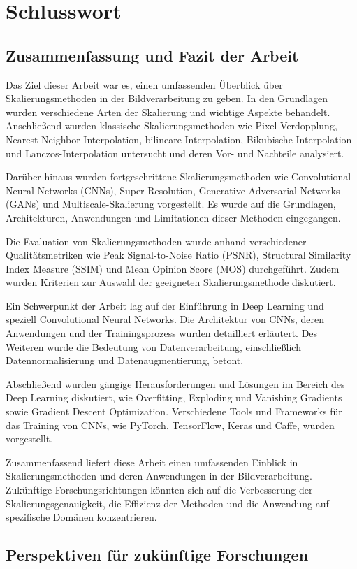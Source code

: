 \chapter{Schlusswort}

\section{Zusammenfassung und Fazit der Arbeit}

Das Ziel dieser Arbeit war es, einen umfassenden Überblick über Skalierungsmethoden in der Bildverarbeitung zu geben.
In den Grundlagen wurden verschiedene Arten der Skalierung und wichtige Aspekte behandelt. Anschließend wurden klassische Skalierungsmethoden wie Pixel-Verdopplung, Nearest-Neighbor-Interpolation, bilineare Interpolation, Bikubische Interpolation und Lanczos-Interpolation untersucht und deren Vor- und Nachteile analysiert.

Darüber hinaus wurden fortgeschrittene Skalierungsmethoden wie Convolutional Neural Networks (CNNs), Super Resolution, Generative Adversarial Networks (GANs) und Multiscale-Skalierung vorgestellt.
Es wurde auf die Grundlagen, Architekturen, Anwendungen und Limitationen dieser Methoden eingegangen.

Die Evaluation von Skalierungsmethoden wurde anhand verschiedener Qualitätsmetriken wie Peak Signal-to-Noise Ratio (PSNR), Structural Similarity Index Measure (SSIM) und Mean Opinion Score (MOS) durchgeführt.
Zudem wurden Kriterien zur Auswahl der geeigneten Skalierungsmethode diskutiert.

Ein Schwerpunkt der Arbeit lag auf der Einführung in Deep Learning und speziell Convolutional Neural Networks.
Die Architektur von CNNs, deren Anwendungen und der Trainingsprozess wurden detailliert erläutert.
Des Weiteren wurde die Bedeutung von Datenverarbeitung, einschließlich Datennormalisierung und Datenaugmentierung, betont.

Abschließend wurden gängige Herausforderungen und Lösungen im Bereich des Deep Learning diskutiert, wie Overfitting, Exploding und Vanishing Gradients sowie Gradient Descent Optimization.
Verschiedene Tools und Frameworks für das Training von CNNs, wie PyTorch, TensorFlow, Keras und Caffe, wurden vorgestellt.

Zusammenfassend liefert diese Arbeit einen umfassenden Einblick in Skalierungsmethoden und deren Anwendungen in der Bildverarbeitung.
Zukünftige Forschungsrichtungen könnten sich auf die Verbesserung der Skalierungsgenauigkeit, die Effizienz der Methoden und die Anwendung auf spezifische Domänen konzentrieren.

\section{Perspektiven für zukünftige Forschungen}

